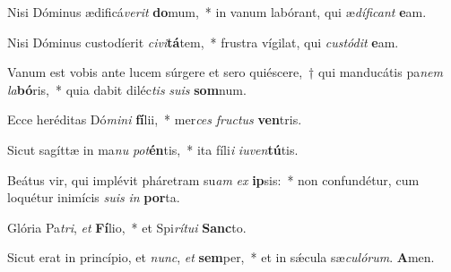 \item Nisi Dóminus ædificá\textit{verit} \textbf{do}mum,~* in vanum labórant, qui æ\textit{díficant} \textbf{e}am.

\item Nisi Dóminus custodíerit \textit{civi}\textbf{tá}tem,~* frustra vígilat, qui \textit{custódit} \textbf{e}am.

\item Vanum est vobis ante lucem súrgere et sero quiéscere,~† qui manducátis pa\textit{nem} \textit{la}\textbf{bó}ris,~* quia dabit diléc\textit{tis} \textit{suis} \textbf{som}num.

\item Ecce heréditas Dó\textit{mini} \textbf{fí}lii,~* mer\textit{ces} \textit{fructus} \textbf{ven}tris.

\item Sicut sagíttæ in ma\textit{nu} \textit{pot}\textbf{én}tis,~* ita fíli\textit{i} \textit{iuven}\textbf{tú}tis.

\item Beátus vir, qui implévit pháretram su\textit{am} \textit{ex} \textbf{ip}sis:~* non confundétur, cum loquétur inimícis \textit{suis} \textit{in} \textbf{por}ta.

\item Glória Pa\textit{tri}, \textit{et} \textbf{Fí}lio,~* et Spi\textit{rítui} \textbf{Sanc}to.

\item Sicut erat in princípio, et \textit{nunc}, \textit{et} \textbf{sem}per,~* et in sǽcula sæ\textit{culórum}. \textbf{A}men.